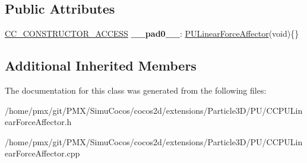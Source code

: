 \subsection*{Public Attributes}
\begin{DoxyCompactItemize}
\item 
\mbox{\label{classPULinearForceAffector_a9d693cabeecbcb23e7ec93f85532c8d9}} 
\hyperlink{_2cocos2d_2cocos_2base_2ccConfig_8h_a25ef1314f97c35a2ed3d029b0ead6da0}{C\+C\+\_\+\+C\+O\+N\+S\+T\+R\+U\+C\+T\+O\+R\+\_\+\+A\+C\+C\+E\+SS} {\bfseries \+\_\+\+\_\+pad0\+\_\+\+\_\+}\+: \hyperlink{classPULinearForceAffector}{P\+U\+Linear\+Force\+Affector}(void)\{\}
\end{DoxyCompactItemize}
\subsection*{Additional Inherited Members}


The documentation for this class was generated from the following files\+:\begin{DoxyCompactItemize}
\item 
/home/pmx/git/\+P\+M\+X/\+Simu\+Cocos/cocos2d/extensions/\+Particle3\+D/\+P\+U/C\+C\+P\+U\+Linear\+Force\+Affector.\+h\item 
/home/pmx/git/\+P\+M\+X/\+Simu\+Cocos/cocos2d/extensions/\+Particle3\+D/\+P\+U/C\+C\+P\+U\+Linear\+Force\+Affector.\+cpp\end{DoxyCompactItemize}
